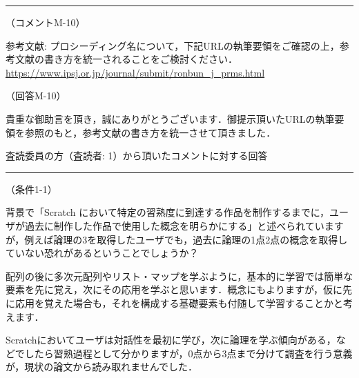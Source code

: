 \documentclass{jarticle} %
\def\section#1{ \vspace{3pc} {\large \gt #1} \vspace{1pc} \hrule }
\def\subsection#1{ \vspace{1pc} {\gt #1} }
\def\nextans{ \vspace{2pc} \hrule }
\begin{document}


\nextans
\subsection{（コメントM-10）}

参考文献: プロシーディング名について，下記URLの執筆要領をご確認の上，参考文献の書き方を統一されることをご検討ください．
\url{https://www.ipsj.or.jp/journal/submit/ronbun_j_prms.html}

\subsection{（回答M-10）}

貴重な御助言を頂き，誠にありがとうございます．御提示頂いたURLの執筆要領を参照のもと，参考文献の書き方を統一させて頂きました．



\newpage
\section{査読委員の方（査読者: 1）から頂いたコメントに対する回答}
\subsection{（条件1-1）}

背景で「Scratch において特定の習熟度に到達する作品を制作するまでに，ユーザが過去に制作した作品で使用した概念を明らかにする」と述べられていますが，例えば論理の3を取得したユーザでも，過去に論理の1点2点の概念を取得していない恐れがあるということでしょうか？

配列の後に多次元配列やリスト・マップを学ぶように，基本的に学習では簡単な要素を先に覚え，次にその応用を学ぶと思います．概念にもよりますが，仮に先に応用を覚えた場合も，それを構成する基礎要素も付随して学習することかと考えます．

Scratchにおいてユーザは対話性を最初に学び，次に論理を学ぶ傾向がある，などでしたら習熟過程として分かりますが，0点から3点まで分けて調査を行う意義が，現状の論文から読み取れませんでした．
\end{document}
